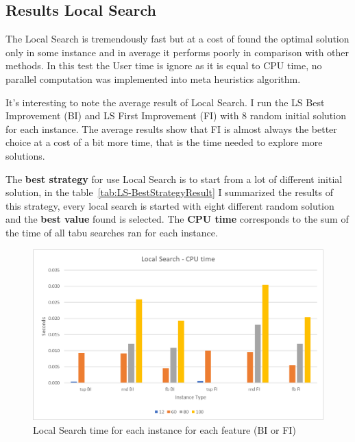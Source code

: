 	
	
\newpage
\subsection{Results Local Search}
	The Local Search is tremendously fast but at a cost of found the optimal solution only in some instance and in average it performs poorly in comparison with other methods. In this test the User time is ignore as it is equal to CPU time, no parallel computation was implemented into meta heuristics algorithm.

	It's interesting to note the average result of Local Search. I run the LS Best Improvement (BI) and LS First Improvement (FI) with 8 random initial solution for each instance. The average results show that FI is almost always the better choice at a cost of a bit more time, that is the time needed to explore more solutions.
	
	The \textbf{best strategy} for use Local Search is to start from a lot of different initial solution, in the table~\ref{tab:LS-BestStrategyResult} I summarized the results of this strategy, every local search is started with eight different random solution and the \textbf{best value} found is selected. The \textbf{CPU time} corresponds to the sum of the time of all tabu searches ran for each instance.
	
	\vspace{10pt}
	
	\begin{figure}[hb]
		\centering
		\includegraphics[width=\linewidth]{img/LS-time}
		\caption{Local Search time for each instance for each feature (BI or FI)}
		\label{fig:ls-time}
	\end{figure}
	
